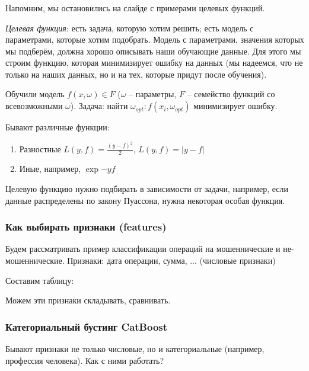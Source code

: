\documentclass[main.tex]{subfiles}
\begin{document}
\subsubsection{}

Напомним, мы остановились на слайде с примерами целевых функций.

\emph{Целевая функция}: есть задача, которую хотим решить; есть модель с параметрами, которые хотим подобрать.
Модель с параметрами, значения которых мы подберём, должна хорошо описывать наши обучающие данные.
Для этого мы строим функцию, которая минимизирует ошибку на данных (мы надеемся, что не только на наших данных, но и на тех, которые придут после обучения).

Обучили модель $f(x, \omega) \in F$ ($\omega$ -- параметры, $F$ -- семейство функций со всевозможными $\omega$).
Задача: найти $\omega_{opt} : f(x_i, \omega_{opt})$ минимизирует ошибку.

Бывают различные функции:

\begin{enumerate}[noitemsep]
	\item Разностные $L(y, f) = \frac{(y-f)^2}{2} $, $ L(y,f) = |y-f|  $
	\item Иные, например, $ \exp{-yf} $
\end{enumerate}

Целевую функцию нужно подбирать в зависимости от задачи, например, если данные распределены по закону Пуассона, нужна некоторая особая функция.

\subsubsection{Как выбирать признаки (features)}

Будем рассматривать пример классификации операций на мошеннические и не-мошеннические.
Признаки: дата операции, сумма, ... (числовые признаки)

Составим таблицу:


Можем эти признаки складывать, сравнивать.

\subsubsection{Категориальный бустинг CatBoost}

Бывают признаки не только числовые, но и категориальные (например, профессия человека).
Как с ними работать?
\end{document}
